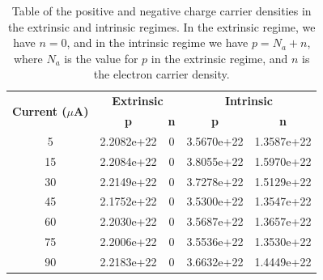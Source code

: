 \documentclass[10pt]{article}
\begin{document}
	\begin{table}[]
		\centering
		\def\arraystretch{1.75}
		\begin{tabular}{|c|cc|cc|}
			\hline
			\multicolumn{1}{|c|}{\multirow{2}{*}{\textbf{Current ($\mu$A)}}} & \multicolumn{2}{c|}{\textbf{Extrinsic}}                           & \multicolumn{2}{c|}{\textbf{Intrinsic}}                           \\ \cline{2-5} 
			\multicolumn{1}{|c|}{}                                           & \multicolumn{1}{c|}{\textbf{p}} & \multicolumn{1}{c|}{\textbf{n}} & \multicolumn{1}{c|}{\textbf{p}} & \multicolumn{1}{c|}{\textbf{n}} \\ \hline
			5                                                                & \multicolumn{1}{l|}{2.2082e+22} & 0                               & \multicolumn{1}{l|}{3.5670e+22} & 1.3587e+22                      \\ \hline
			15                                                               & \multicolumn{1}{l|}{2.2084e+22} & 0                               & \multicolumn{1}{l|}{3.8055e+22} & 1.5970e+22                      \\ \hline
			30                                                               & \multicolumn{1}{l|}{2.2149e+22} & 0                               & \multicolumn{1}{l|}{3.7278e+22} & 1.5129e+22                      \\ \hline
			45                                                               & \multicolumn{1}{l|}{2.1752e+22} & 0                               & \multicolumn{1}{l|}{3.5300e+22} & 1.3547e+22                      \\ \hline
			60                                                               & \multicolumn{1}{l|}{2.2030e+22} & 0                               & \multicolumn{1}{l|}{3.5687e+22} & 1.3657e+22                      \\ \hline
			75                                                               & \multicolumn{1}{l|}{2.2006e+22} & 0                               & \multicolumn{1}{l|}{3.5536e+22} & 1.3530e+22                      \\ \hline
			90                                                               & \multicolumn{1}{l|}{2.2183e+22} & 0                               & \multicolumn{1}{l|}{3.6632e+22} & 1.4449e+22                      \\ \hline
		\end{tabular}
		\caption{Table of the positive and negative charge carrier densities in the extrinsic and intrinsic
			regimes. In the extrinsic regime, we have \( n = 0 \), and in the intrinsic regime we have \( p = N_a
			+ n\), where \( N_a \) is the value for \( p \) in the extrinsic regime, and \( n \) is the electron
		carrier density.}
		\label{densities}
	\end{table}
\end{document}
